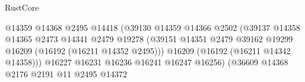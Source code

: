 \begin{lexlean}{RustCore}
\begin{coremodule}
                                                            @14359
                                                            @14368
                                                            @2495
                                                            @14418
                                                            (@39130
                                                              @14359
                                                              @14366
                                                              @2502
                                                              (@39137
                                                                @14358
                                                                @14365
                                                                @2473
                                                                @14341
                                                                @2479
                                                                @19278
                                                                (@39151
                                                                  @14351
                                                                  @2479
                                                                  @39162
                                                                  @19299
                                                                  @16209
                                                                  (@16192 (@16211 @14352 @2495)))
                                                                @16209
                                                                (@16192 (@16211 @14342 @14358)))
                                                              @16227
                                                              @16231
                                                              @16236
                                                              @16241
                                                              @16247
                                                              @16256)
                                                            (@36609
                                                              @14368
                                                              @2176
                                                              @2191
                                                              @11
                                                              @2495
                                                              @14372

\end{coremodule}
\end{lexlean}

